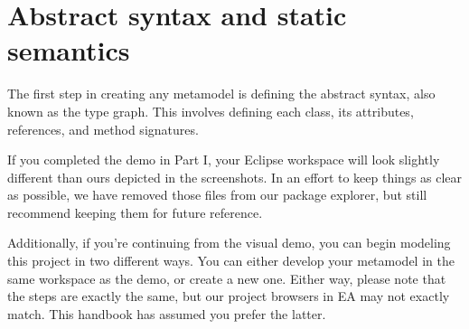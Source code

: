 \newpage
\section{Abstract syntax and static semantics}
\genHeader
\label{sec: staticSemantics}

The first step in creating any metamodel is defining the abstract syntax, also known as the type graph. This involves defining each class, its attributes,
references, and method signatures.

If you completed the demo in Part I, your Eclipse workspace will look slightly different than ours depicted in the screenshots.
In an effort to keep things as clear as possible, we have removed those files from our package explorer, but still recommend keeping them for future reference. 

Additionally, if you're continuing from the visual demo, you can begin modeling this project in two different ways. 
You can either develop your metamodel in the same workspace as the demo, or create a new one.
Either way, please note that the steps are exactly the same, but our project browsers in EA may not exactly match.
This handbook has assumed you prefer the latter.
















 
